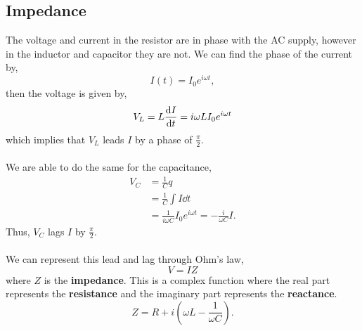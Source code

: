 \documentclass{book}
\begin{document}
\subsection{Impedance}
The voltage and current in the resistor are in phase with the AC supply, however in the inductor and capacitor they are not. We can find the phase of the current by,
\begin{equation}
    I(t) = I_0e^{i\omega t},
\end{equation}
then the voltage is given by,
\begin{equation}
    V_L = L\dv{I}{t} = i\omega L I_0e^{i\omega t}
\end{equation}
which implies that $V_L$ leads $I$ by a phase of $\frac{\pi}{2}$. \\\\
We are able to do the same for the capacitance,
\begin{equation}
    \begin{split}
        V_C &= \frac{1}{C}q\\
        & = \frac{1}{C}\int I \dd{t} \\ 
        & = \frac{1}{i\omega C}I_0 e^{i\omega t} = -\frac{i}{\omega C}I.
    \end{split}
\end{equation}
Thus, $V_C$ lags $I$ by $\frac{\pi}{2}$.\\\\
We can represent this lead and lag through Ohm's law,
\begin{equation}
    V = IZ
\end{equation}
where $Z$ is the \textbf{impedance}. This is a complex function where the real part represents the \textbf{resistance} and the imaginary part represents the \textbf{reactance}.
\begin{equation}
    Z = R + i\left( \omega L - \frac{1}{\omega C} \right).
\end{equation}
\end{document}
